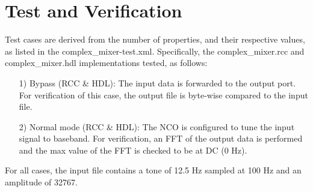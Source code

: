 \documentclass{article}
\def\comp{complex\_mixer}
\begin{document}
\section*{Test and Verification}
\begin{flushleft}
	Test cases are derived from the number of properties, and their respective values, as listed in the complex\_mixer-test.xml. Specifically, the \comp.rcc and \comp.hdl implementations tested, as follows:

	\begin{itemize}
		\item[1)] Bypass (RCC \& HDL): The input data is forwarded to the output port. For 				verification of this case, the output file is byte-wise compared to the input file.
		\item[2)] Normal mode (RCC \& HDL): The NCO is configured to tune the input signal to 		baseband. For verification, an FFT of the output data is performed and the max value 			of the FFT is checked to be at DC (0 Hz).
	\end{itemize}

For all cases, the input file contains a tone of 12.5 Hz sampled at 100 Hz and an amplitude of 32767.
\end{flushleft}
\end{document}
